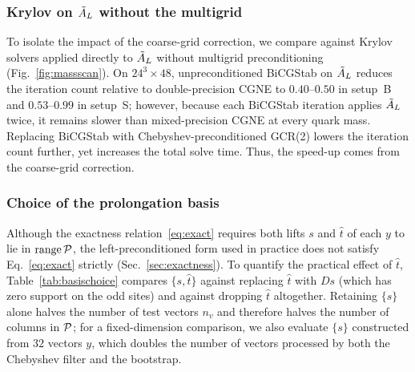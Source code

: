 \subsubsection{Krylov on $\tilde A_{L}$ without the multigrid}
\label{sec:nomg}

To isolate the impact of the coarse-grid correction, we compare against Krylov solvers applied
directly to $\tilde A_{L}$ without multigrid preconditioning (Fig.~\ref{fig:massscan}). On $24^3\times48$,
unpreconditioned BiCGStab on $\tilde A_{L}$ reduces the iteration count relative to double-precision CGNE to
\New $0.40$--$0.50$ in setup~B and $0.53$--$0.99$ in setup~S; however, because
each BiCGStab iteration applies $\tilde A_{L}$ twice, it remains slower than mixed-precision CGNE at every
quark mass. Replacing BiCGStab with Chebyshev-preconditioned GCR(2) lowers the iteration count
further, yet increases the total solve time. Thus, the speed-up comes from the coarse-grid
correction.


\subsubsection{Choice of the prolongation basis}
\label{sec:basischoice}
Although the exactness relation~\eqref{eq:exact} requires both lifts $s$ and $\hat t$ of each $y$
to lie in $\operatorname{range}\mathcal P$, the left-preconditioned form used in practice does not
satisfy Eq.~\eqref{eq:exact} strictly (Sec.~\ref{sec:exactness}). To quantify the practical effect
of $\hat t$, Table~\ref{tab:basischoice} compares $\{s,\hat t\}$ against replacing $\hat t$ with
$Ds$ (which has zero support on the odd sites) and against dropping $\hat t$ altogether. Retaining
$\{s\}$ alone \New halves the number of test vectors $n_v$ and therefore halves
the number of columns in $\mathcal P$; for a fixed-dimension comparison, we also evaluate $\{s\}$
constructed from $32$ vectors $y$, which doubles the number of vectors processed by both the
Chebyshev filter and the bootstrap.

